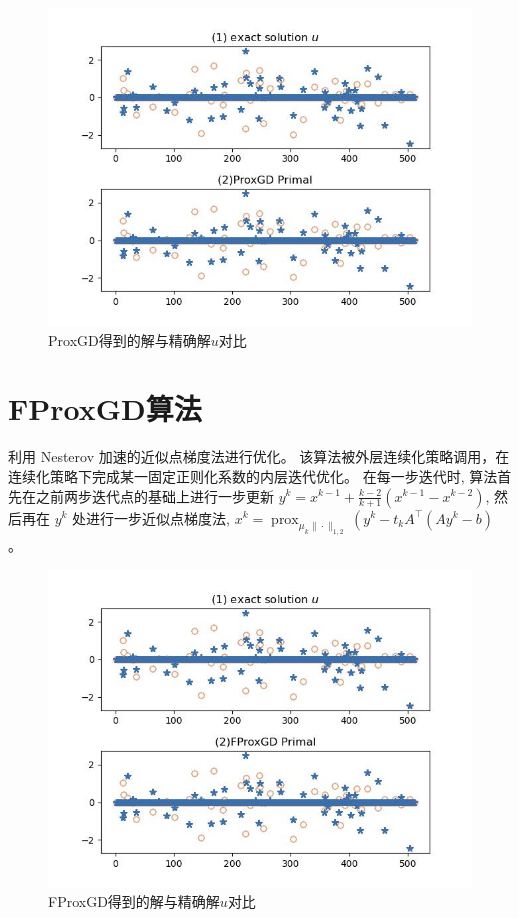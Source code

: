 \documentclass[12pt]{article}
\begin{document}
 
 	\begin{figure}[H]
 	\centering
 	\includegraphics[width=\textwidth]{figs/ProxGD Primal.jpg}
 	\caption{ProxGD得到的解与精确解$u$对比}
 \end{figure}
 
 
 \section{FProxGD算法}
 利用 Nesterov 加速的近似点梯度法进行优化。
 该算法被外层连续化策略调用，在连续化策略下完成某一固定正则化系数的内层迭代优化。
 在每一步迭代时, 算法首先在之前两步迭代点的基础上进行一步更新 $y^k=x^{k-1}+\frac{k-2}{k+1}\left(x^{k-1}-x^{k-2}\right)$, 然后再在 $y^k$ 处进行一步近似点梯度法, $x^k=\operatorname{prox}_{\mu_k \|\cdot\|_{1,2} }\left(y^k-t_k A^{\top}\left(A y^k-b\right)\right.$ 。
 
 	\begin{figure}[H]
 	\centering
 	\includegraphics[width=\textwidth]{figs/FProxGD Primal.jpg}
 	\caption{FProxGD得到的解与精确解$u$对比}
 \end{figure}
 
\end{document}
